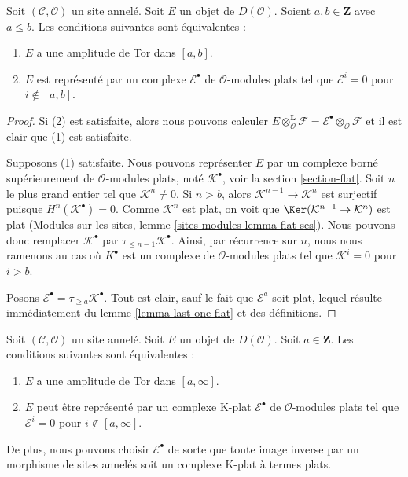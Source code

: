 \begin{lemma}
\label{lemma-tor-amplitude}
Soit $(\mathcal{C}, \mathcal{O})$ un site annelé. Soit $E$ un objet de
$D(\mathcal{O})$. Soient $a, b \in \mathbf{Z}$ avec $a \leq b$. Les
conditions suivantes sont équivalentes :
\begin{enumerate}
\item $E$ a une amplitude de Tor dans $[a, b]$.
\item $E$ est représenté par un complexe $\mathcal{E}^\bullet$ de
$\mathcal{O}$-modules plats tel que $\mathcal{E}^i = 0$ pour
$i \not \in [a, b]$.
\end{enumerate}
\end{lemma}

\begin{proof}
Si (2) est satisfaite, alors nous pouvons calculer
$E \otimes_\mathcal{O}^\mathbf{L} \mathcal{F} =
\mathcal{E}^\bullet \otimes_\mathcal{O} \mathcal{F}$
et il est clair que (1) est satisfaite.

\medskip\noindent
Supposons (1) satisfaite. Nous pouvons représenter $E$ par un complexe borné
supérieurement de $\mathcal{O}$-modules plats, noté $\mathcal{K}^\bullet$, voir
la section \ref{section-flat}. Soit $n$ le plus grand entier tel que
$\mathcal{K}^n \not = 0$. Si $n > b$, alors
$\mathcal{K}^{n - 1} \to \mathcal{K}^n$ est surjectif puisque
$H^n(\mathcal{K}^\bullet) = 0$. Comme $\mathcal{K}^n$ est plat, on voit que
$\Ker(\mathcal{K}^{n - 1} \to \mathcal{K}^n)$ est plat (Modules sur les sites,
lemme \ref{sites-modules-lemma-flat-ses}). Nous pouvons donc remplacer
$\mathcal{K}^\bullet$ par $\tau_{\leq n - 1}\mathcal{K}^\bullet$. Ainsi, par
récurrence sur $n$, nous nous ramenons au cas où $K^\bullet$ est un complexe
de $\mathcal{O}$-modules plats tel que $\mathcal{K}^i = 0$ pour $i > b$.

\medskip\noindent
Posons $\mathcal{E}^\bullet = \tau_{\geq a}\mathcal{K}^\bullet$.
Tout est clair, sauf le fait que $\mathcal{E}^a$ soit plat, lequel résulte
immédiatement du lemme \ref{lemma-last-one-flat} et des définitions.
\end{proof}

\begin{lemma}
\label{lemma-bounded-below-tor-amplitude}
Soit $(\mathcal{C}, \mathcal{O})$ un site annelé. Soit $E$ un objet de
$D(\mathcal{O})$. Soit $a \in \mathbf{Z}$. Les conditions suivantes sont
équivalentes :
\begin{enumerate}
\item $E$ a une amplitude de Tor dans $[a, \infty]$.
\item $E$ peut être représenté par un complexe K-plat
$\mathcal{E}^\bullet$ de $\mathcal{O}$-modules plats tel que
$\mathcal{E}^i = 0$ pour $i \not \in [a, \infty]$.
\end{enumerate}
De plus, nous pouvons choisir $\mathcal{E}^\bullet$ de sorte que toute image
inverse par un morphisme de sites annelés soit un complexe K-plat à termes
plats.
\end{lemma}

